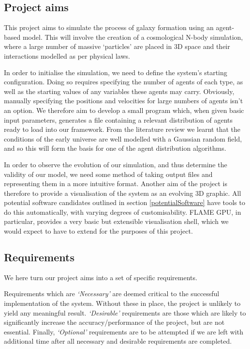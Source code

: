 \documentclass[11pt,a4paper]{article}
\begin{document}
\subsection{Project aims}
This project aims to simulate the process of galaxy formation using an agent-based model. This will involve the creation of a cosmological N-body simulation, where a large number of massive `particles' are placed in 3D space and their interactions modelled as per physical laws. 

In order to initialise the simulation, we need to define the system's starting configuration. Doing so requires specifying the number of agents of each type, as well as the starting values of any variables these agents may carry. Obviously, manually specifying the positions and velocities for large numbers of agents isn't an option. We therefore aim to develop a small program which, when given basic input parameters, generates a file containing a relevant distribution of agents ready to load into our framework. From the literature review we learnt that the conditions of the early universe are well modelled with a Gaussian random field, and so this will form the basis for one of the agent distribution algorithms.

In order to observe the evolution of our simulation, and thus determine the validity of our model, we need some method of taking output files and representing them in a more intuitive format. Another aim of the project is therefore to provide a visualisation of the system as an evolving 3D graphic. All potential software candidates outlined in section \ref{potentialSoftware} have tools to do this automatically, with varying degrees of customisability. FLAME GPU, in particular, provides a very basic but extensible visualisation shell, which we would expect to have to extend for the purposes of this project. 

\subsection{Requirements}
We here turn our project aims into a set of specific requirements.

Requirements which are \emph{`Necessary'} are deemed critical to the successful implementation of the system. Without these in place, the project is unlikely to yield any meaningful result. \emph{`Desirable'} requirements are those which are likely to significantly increase the accuracy/performance of the project, but are not essential. Finally, \emph{`Optional'} requirements are to be attempted if we are left with additional time after all necessary and desirable requirements are completed.
\end{document}
